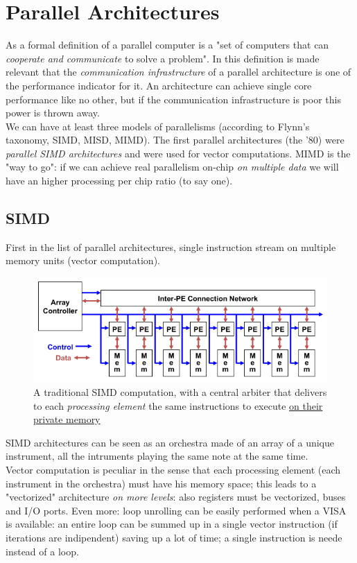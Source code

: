 \documentclass[10pt,a4paper]{article}
\begin{document}
		\section{Parallel Architectures}
			As a formal definition of a parallel computer is a "set of computers that can \emph{cooperate and communicate} to solve a problem". In this definition is made relevant that the \emph{communication infrastructure} of a parallel architecture is one of the performance indicator for it. An architecture can achieve single core performance like no other, but if the communication infrastructure is poor this power is thrown away.\\
			We can have at least three models of parallelisms (according to Flynn's taxonomy, SIMD, MISD, MIMD). The first parallel architectures (the '80) were \emph{parallel SIMD architectures} and were used for vector computations. MIMD is the "way to go": if we can achieve real parallelism on-chip \emph{on multiple data} we will have an higher processing per chip ratio (to say one).
			
			\subsection{SIMD}
				First in the list of parallel architectures, single instruction stream on multiple memory units (vector computation).
				\begin{figure}[H]
					\centering
					\includegraphics[width = \textwidth]{./images/SIMD.png}
					\caption{A traditional SIMD computation, with a central arbiter that delivers to each \emph{processing element} the same instructions to execute \underline{on their private memory}}
				\end{figure}
				SIMD architectures can be seen as an orchestra made of an array of a unique instrument, all the intruments playing the same note at the same time.\\
				Vector computation is peculiar in the sense that each processing element (each instrument in the orchestra) must have his memory space; this leads to a "vectorized" architecture \emph{on more levels}: also registers must be vectorized, buses and I/O ports. Even more: loop unrolling can be easily performed when a VISA is available: an entire loop can be summed up in a single vector instruction (if iterations are indipendent) saving up a lot of time; a single instruction is neede instead of a loop. 
				
\end{document}
